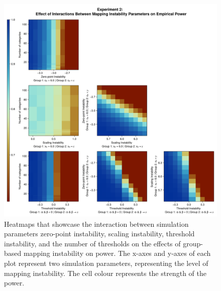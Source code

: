 \documentclass[titlepage, a4paper, 11pt]{article}
\begin{document}
\begin{figure}
    \centering
    \includegraphics[width=1\linewidth]{Plots/Interactions_measurement_instability_power_group_based.png}
    \caption{Heatmaps that showcase the interaction between simulation parameters zero-point instability, scaling instability, threshold instability, and the number of thresholds on the effects of group-based mapping instability on power. The x-axes and y-axes of each plot represent two simulation parameters, representing the level of mapping instability. The cell colour represents the strength of the power.}
    \label{fig:plot_five}
\end{figure}
\end{document}

